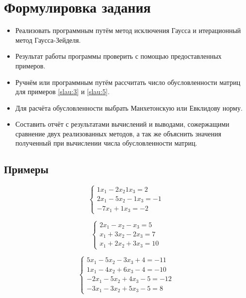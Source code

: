 \documentclass[a4paper]{article}
\begin{document}
\section{Формулировка задания}
\begin{itemize}
    \item Реализовать программным путём метод исключения Гаусса и итерационный метод Гаусса-Зейделя. 
    \item Результат работы программы проверить с помощью предоставленных примеров.
    \item Ручнём или программным путём рассчитать число обусловленности матриц для примеров \eqref{slau:3} и \eqref{slau:5}.
    \item Для расчёта обусловленности выбрать Манхетонскую или Евклидову норму.
    \item Составить отчёт с результатами вычислений и выводами, сожержащими сравнение двух реализованных методов, а так же объяснить значения полученный при вычислении числа обусловленности матриц.
\end{itemize}

\subsection{Примеры}

\begin{equation}
    \begin{cases*}
        1 x_1  -2 x_2 1  x_3 = 2 \\
        2 x_1  -5 x_2 -1 x_3 = -1 \\
        -7x_1   + 1x_3 = -2
    \end{cases*} \label{slau:1}
\end{equation}

\begin{equation}
    \begin{cases*}
        2x_1 - x_2 - x_3 = 5 \\
        x_1 + 3x_2 - 2x_3 = 7 \\
        x_1 + 2x_2 + 3x_3 = 10
    \end{cases*} \label{slau:2}
\end{equation}

\begin{equation}
    \begin{cases}
        5  x_1 -5 x_2 -3 x_3 +4 = -11 \\
        1  x_1 -4 x_2 +6 x_3 -4 = -10 \\
        -2 x_1 -5 x_2 +4 x_3 -5 = -12 \\
        -3 x_1 -3 x_2 +5 x_3 -5 = 8
    \end{cases} \label{slau:3}
\end{equation}
\end{document}
